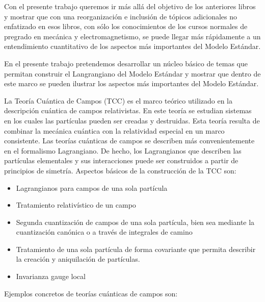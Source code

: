 Con el presente trabajo queremos ir más allá del objetivo de los anteriores libros y mostrar que con una reorganización e inclusión de tópicos adicionales no enfatizado en esos libros, con sólo los conocimientos de los cursos normales de pregrado en mecánica y electromagnetismo, se puede llegar más rápidamente a un entendimiento cuantitativo de los aspectos más importantes del Modelo Estándar.  

En el presente trabajo pretendemos desarrollar un núcleo básico de temas que permitan construir el Langrangiano del Modelo Estándar y mostrar que dentro de este marco se pueden ilustrar los aspectos más importantes del Modelo Estándar.

La Teoría Cuántica de Campos (TCC) es el marco teórico utilizado en la descripción cuántica de campos relativistas. En este teoría se estudian sistemas en los cuales las partículas pueden ser creadas y destruidas. Esta teoría resulta de combinar la mecánica cuántica con la relatividad especial en un marco consistente. Las teorías cuánticas de campos se describen más convenientemente en el formalismo Lagrangiano. De hecho, los Lagrangianos que describen las partículas elementales y sus interacciones puede ser construidos a partir de principios de simetría.  Aspectos básicos de la construcción de la TCC son:
\begin{itemize} %
\item Lagrangianos para campos de una sola partícula
\item Tratamiento relativístico de un campo
\item Segunda cuantización de campos de una sola partícula, bien sea mediante la cuantización canónica o a través de integrales de camino
\item Tratamiento de una sola partícula de forma covariante que permita describir la creación y aniquilación de partículas.
\item Invarianza gauge local
\end{itemize}
Ejemplos concretos de teorías cuánticas de campos son:
